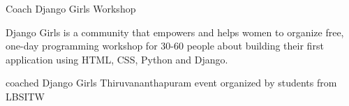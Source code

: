 

\begin{cvexperiences}

  \cvexperience
    {Coach} %
    {Django Girls Workshop} %
    {} %
    {} %
    {
      \begin{cvparagraph} %
       Django Girls is a community that empowers and helps women to organize free, one-day programming workshop for 30-60 people about building their first application using HTML, CSS, Python and Django.
      \end{cvparagraph}
   }
    {
      \begin{cvitems} %
        \item {coached Django Girls Thiruvananthapuram event organized by students from LBSITW}
      \end{cvitems}
    }

\end{cvexperiences}
